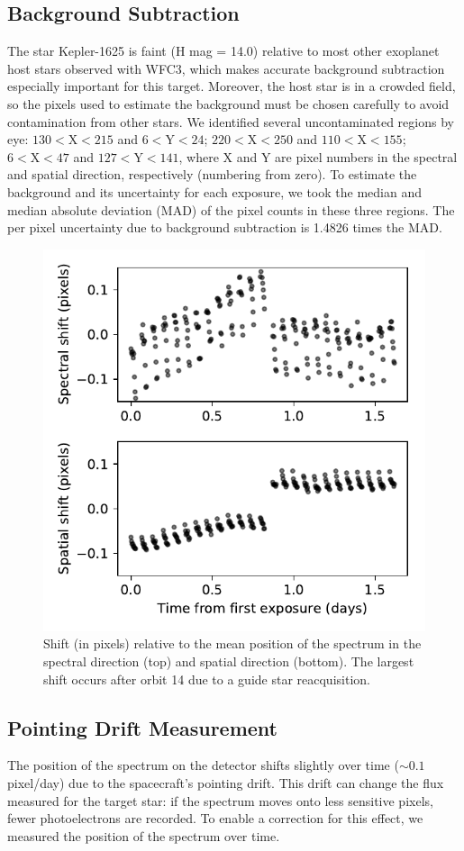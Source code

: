 \documentclass[twocolumn]{aastex62}
\begin{document}
\subsection{Background Subtraction} 
\label{sec:background}
The star Kepler-1625 is faint (H mag = 14.0) relative to most other exoplanet host stars observed with WFC3, which makes accurate background subtraction especially important for this target. Moreover, the host star is in a crowded field, so the pixels used to estimate the background must be chosen carefully to avoid contamination from other stars.  We identified several uncontaminated regions by eye: $130 < \mathrm{X} < 215$ and $6 < \mathrm{Y}  < 24$;  $220 < \mathrm{X} < 250$ and $110 < \mathrm{X} < 155$; $6 < \mathrm{X} < 47$ and $127 < \mathrm{Y} < 141$, where X and Y are pixel numbers in the spectral and spatial direction, respectively (numbering from zero).  To estimate the background and its uncertainty for each exposure, we took the median and median absolute deviation (MAD) of the pixel counts in these three regions. The per pixel uncertainty due to background subtraction is 1.4826 times the MAD.

\begin{figure}
\includegraphics[width = 0.5 \textwidth]{figures/fig4_shifts.pdf}
    \caption{Shift (in pixels) relative to the mean position of the spectrum in the spectral direction (top) and spatial direction (bottom). The largest shift occurs after orbit 14 due to a guide star reacquisition.}
\label{fig:shifts}
\end{figure}

\subsection{Pointing Drift Measurement}
The position of the spectrum on the detector shifts slightly over time ($\sim0.1$ pixel/day) due to the spacecraft's pointing drift. This drift can change the flux measured for the target star: if the spectrum moves onto less sensitive pixels, fewer photoelectrons are recorded. To enable a correction for this effect, we measured the position of the spectrum over time.  
\end{document}

